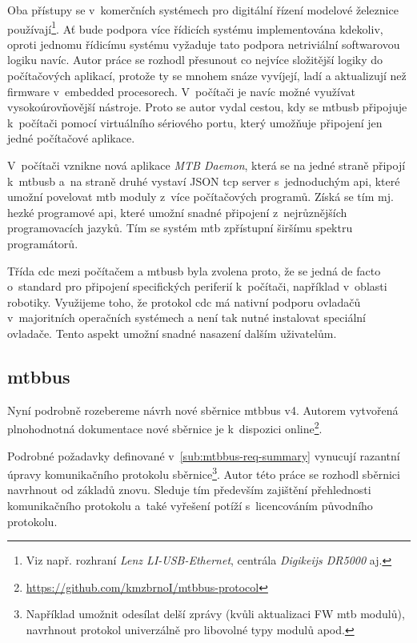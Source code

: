 Oba přístupy se v~komerčních systémech pro digitální řízení modelové železnice
používají\footnote{Viz např. rozhraní \textit{Lenz LI-USB-Ethernet}, centrála
\textit{Digikeijs DR5000} aj.}.
Ať bude podpora více řídicích systému implementována kdekoliv, oproti jednomu
řídicímu systému vyžaduje tato podpora netriviální softwarovou logiku navíc.
Autor práce se rozhodl přesunout co nejvíce složitější logiky do počítačových
aplikací, protože ty se mnohem snáze vyvíjejí, ladí a aktualizují než
firmware v~embedded procesorech. V~počítači je navíc možné využívat
vysokoúrovňovější nástroje. Proto se autor vydal cestou, kdy se
\gls{mtbusb} připojuje k~počítači pomocí virtuálního sériového portu, který
umožňuje připojení jen jedné počítačové aplikace.

V~počítači vznikne nová aplikace \textit{MTB Daemon}, která se na jedné
straně připojí k~\gls{mtbusb} a~na straně druhé vystaví JSON \gls{tcp}
server s~jednoduchým \gls{api}, které umožní povelovat \gls{mtb} moduly z~více
počítačových programů. Získá se tím mj. hezké programové \gls{api}, které
umožní snadné připojení z~nejrůznějších programovacích jazyků.
Tím se systém \gls{mtb} zpřístupní širšímu spektru programátorů.

Třída \gls{cdc} mezi počítačem a \gls{mtbusb} byla zvolena proto, že se jedná
de facto o~standard pro připojení specifických periferií k~počítači, například
v~oblasti robotiky. Využijeme toho, že protokol \gls{cdc} má nativní
podporu ovladačů v~majoritních operačních systémech a není tak nutné instalovat
speciální ovladače. Tento aspekt umožní snadné nasazení dalším uživatelům.

\subsection{\gls{mtbbus}}

Nyní podrobně rozebereme návrh nové sběrnice \gls{mtbbus} v4. Autorem vytvořená
plnohodnotná dokumentace nové sběrnice je k~dispozici
online\footnote{\url{https://github.com/kmzbrnoI/mtbbus-protocol}}.

Podrobné požadavky definované v~\ref{sub:mtbbus-req-summary} vynucují razantní
úpravy komunikačního protokolu sběrnice\footnote{Například umožnit odesílat
delší zprávy (kvůli aktualizaci FW \gls{mtb} modulů), navrhnout protokol
univerzálně pro libovolné typy modulů apod.}. Autor této práce se rozhodl
sběrnici navrhnout od základů znovu. Sleduje tím především zajištění
přehlednosti komunikačního protokolu a~také vyřešení potíží s~licencováním
původního protokolu.

